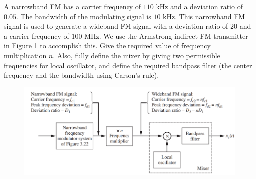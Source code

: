 \documentclass{assignment}
\begin{document}
\begin{prob}
    A narrowband FM has a carrier frequency of $110$ kHz and a deviation ratio of $0.05$. The bandwidth of the modulating signal is $10$ kHz. This narrowband FM signal is used to generate a wideband FM signal with a deviation ratio of $20$ and a carrier frequency of $100$ MHz. We use the Armstrong indirect FM transmitter in Figure \ref{A-5-P-5} to accomplish this. Give the required value of frequency multiplication $n$. Also, fully define the mixer by giving two permissible frequencies for local oscillator, and define the required bandpass filter (the center frequency and the bandwidth using Carson's rule).
    \begin{figure}[h]
        \centering
        \includegraphics[width=.8\columnwidth]{Assignment-5-Problem-5.png}
        \caption{}
        \label{A-5-P-5}
    \end{figure}
\end{prob}
\begin{sol}
    
\end{sol}
\end{document}
